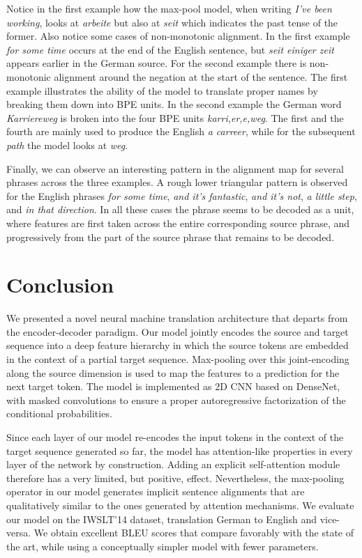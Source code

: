 \documentclass[11pt,a4paper]{article}
\begin{document}
Notice in the first example how the max-pool model, when writing \emph{I've been working}, looks at \emph{arbeite} but also at \emph{seit} which indicates the past tense of the former.
Also notice some cases of non-monotonic alignment. In the first example  \emph{for some time}  occurs at the end of the English sentence, but \emph{seit einiger zeit} appears earlier in the German source. 
For the second example there is non-monotonic alignment around the negation at the start of the sentence.
The first example illustrates the ability of the model to translate proper names by breaking them down into BPE units.
In the second example the German word \emph{Karriereweg} is broken into the four BPE units \emph{karri,er,e,weg}. The first and the fourth are mainly used to produce the English \emph{a carreer}, while for the subsequent \emph{path} the model looks at \emph{weg}.

Finally, we can observe an interesting pattern in the alignment map for several phrases across the three examples. A rough lower triangular pattern is observed for the English phrases \emph{for some time}, \emph{and it's fantastic}, \emph{and it's not}, \emph{a little step}, and \emph{in that direction}. 
In all these cases the phrase seems to be decoded as a unit, where features are first taken across the entire corresponding source phrase, and progressively from the part of the source phrase that remains to be decoded.
 
\section{Conclusion}
\label{sec:conclusion}



We presented a novel neural machine translation architecture that departs from the encoder-decoder paradigm. 
Our model jointly encodes the source and target sequence into a deep feature hierarchy in which the source tokens are embedded in the context of a partial target sequence. 
Max-pooling over this joint-encoding along the source dimension is used to map the features to a prediction for the next target token. 
The model is implemented as 2D CNN based on DenseNet, 
with masked convolutions to ensure a proper autoregressive factorization of the conditional probabilities.

Since each layer  of our model re-encodes the input tokens in the context of the target sequence generated so far, the model has attention-like properties in every layer of the network by construction.
Adding an explicit self-attention module therefore has a very limited, but positive, effect. 
Nevertheless, the max-pooling  operator in our model generates implicit sentence alignments that are qualitatively similar to the ones generated by attention mechanisms.
We evaluate our model on  the IWSLT'14 dataset, translation German to English and vice-versa. 
We obtain excellent BLEU scores that compare favorably with the state of the art, while using a conceptually simpler model with fewer parameters.
\end{document}
